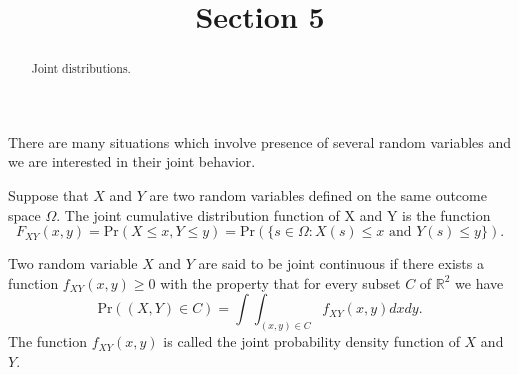 \documentclass{ximera}
\title{Section 5}
\begin{document}
\begin{abstract}
Joint distributions.
\end{abstract}
\maketitle

There are many situations which involve presence of several random variables and we are interested in their joint behavior. \vspace{.25cm}

Suppose that $X$ and $Y$ are two random variables defined on the same outcome space $\Omega$. The joint cumulative distribution function of X and Y is the function
\begin{equation*}
F_{XY}(x,y)=\text{Pr}(X\leq x,Y\leq y)=\text{Pr}(\{ s\in\Omega : X(s)\leq x \text{ and } Y(s)\leq y \}).
\end{equation*}

Two random variable $X$ and $Y$ are said to be joint continuous if there exists a function $f_{XY}(x,y)\geq 0$ with the property that for every subset $C$ of $\mathbb{R}^{2}$ we have
\begin{equation*}
\text{Pr}((X,Y)\in C)=\int\int_{(x,y)\in C} f_{XY}(x,y)dxdy.
\end{equation*}
The function $f_{XY}(x,y)$ is called the joint probability density function of $X$ and $Y$.
\end{document}
